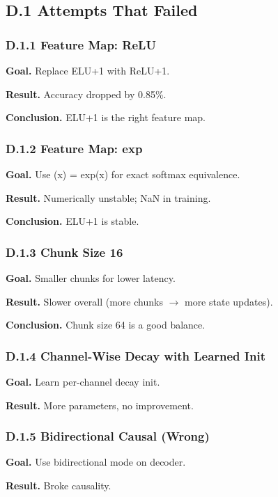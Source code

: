 \subsection{D.1 Attempts That Failed}

\subsubsection{D.1.1 Feature Map: ReLU}

\textbf{Goal.} Replace ELU+1 with ReLU+1.

\textbf{Result.} Accuracy dropped by 0.85\%.

\textbf{Conclusion.} ELU+1 is the right feature map.

\subsubsection{D.1.2 Feature Map: exp}

\textbf{Goal.} Use  (x) = exp(x) for exact softmax equivalence.

\textbf{Result.} Numerically unstable; NaN in training.

\textbf{Conclusion.} ELU+1 is stable.

\subsubsection{D.1.3 Chunk Size 16}

\textbf{Goal.} Smaller chunks for lower latency.

\textbf{Result.} Slower overall (more chunks $\to$ more state updates).

\textbf{Conclusion.} Chunk size 64 is a good balance.

\subsubsection{D.1.4 Channel-Wise Decay with Learned Init}

\textbf{Goal.} Learn per-channel decay init.

\textbf{Result.} More parameters, no improvement.

\subsubsection{D.1.5 Bidirectional Causal (Wrong)}

\textbf{Goal.} Use bidirectional mode on decoder.

\textbf{Result.} Broke causality.

